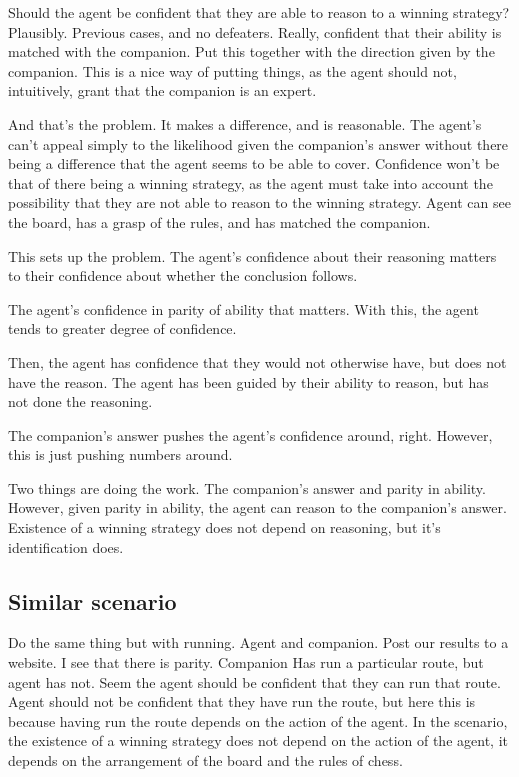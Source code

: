 \documentclass[10pt]{article}
\begin{document}
Should the agent be confident that they are able to reason to a winning strategy?
Plausibly.
Previous cases, and no defeaters.
Really, confident that their ability is matched with the companion.
Put this together with the direction given by the companion.
This is a nice way of putting things, as the agent should not, intuitively, grant that the companion is an expert.

And that's the problem.
It makes a difference, and is reasonable.
The agent's can't appeal simply to the likelihood given the companion's answer without there being a difference that the agent seems to be able to cover.
Confidence won't be that of there being a winning strategy, as the agent must take into account the possibility that they are not able to reason to the winning strategy.
Agent can see the board, has a grasp of the rules, and has matched the companion.

\begin{note}
  This sets up the problem.
  The agent's confidence about their reasoning matters to their confidence about whether the conclusion follows.
\end{note}

The agent's confidence in parity of ability that matters.
With this, the agent tends to greater degree of confidence.

Then, the agent has confidence that they would not otherwise have, but does not have the reason.
The agent has been guided by their ability to reason, but has not done the reasoning.

The companion's answer pushes the agent's confidence around, right.
However, this is just pushing numbers around.

Two things are doing the work.
The companion's answer and parity in ability.
However, given parity in ability, the agent can reason to the companion's answer.
Existence of a winning strategy does not depend on reasoning, but it's identification does.

\subsection{Similar scenario}
\label{sec:similar-scenario}

Do the same thing but with running.
Agent and companion.
Post our results to a website.
I see that there is parity.
Companion Has run a particular route, but agent has not.
Seem the agent should be confident that they can run that route.
Agent should not be confident that they have run the route, but here this is because having run the route depends on the action of the agent.
In the scenario, the existence of a winning strategy does not depend on the action of the agent, it depends on the arrangement of the board and the rules of chess.
\end{document}

